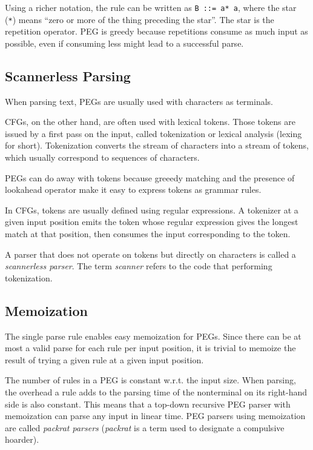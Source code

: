 Using a richer notation, the rule can be written as \texttt{B ::= a* a}, where
the star (\texttt{*}) means ``zero or more of the thing preceding the
star''. The star is the repetition operator. PEG is greedy because repetitions
consume as much input as possible, even if consuming less might lead to a
successful parse.

\subsection{Scannerless Parsing}

When parsing text, PEGs are usually used with characters as terminals.

CFGs, on the other hand, are often used with lexical tokens. Those tokens are
issued by a first pass on the input, called tokenization or lexical analysis
(lexing for short). Tokenization converts the stream of characters into a stream
of tokens, which usually correspond to sequences of characters.

PEGs can do away with tokens because greeedy matching and the presence of
lookahead operator make it easy to express tokens as grammar rules.

In CFGs, tokens are usually defined using regular expressions. A tokenizer at a
given input position emits the token whose regular expression gives the longest
match at that position, then consumes the input corresponding to the token.

A parser that does not operate on tokens but directly on characters is called a
\emph{scannerless parser}. The term \emph{scanner} refers to the code that
performing tokenization.

\subsection{Memoization}
\label{peg_memoization}

The single parse rule enables easy memoization for PEGs. Since there can be at
most a valid parse for each rule per input position, it is trivial to memoize
the result of trying a given rule at a given input position.

The number of rules in a PEG is constant w.r.t. the input size. When parsing,
the overhead a rule adds to the parsing time of the nonterminal on its
right-hand side is also constant. This means that a top-down recursive PEG
parser with memoization can parse any input in linear time. PEG parsers using
memoization are called \emph{packrat parsers} (\emph{packrat} is a term used to
designate a compulsive hoarder).

